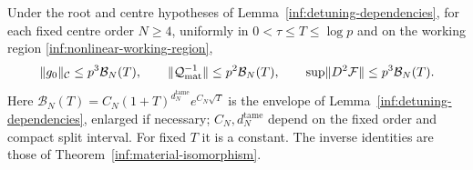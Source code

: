\begin{proposition}\label{inf:sharp-material}
Under the root and centre hypotheses of
Lemma~\ref{inf:detuning-dependencies}, for each fixed centre order
$N\ge4$, uniformly in
$0<\tau\le T\le\log p$ and on the working region
\eqref{inf:nonlinear-working-region},
\begin{equation}\label{inf:sharp-three-bounds}
 \lVert g_0\rVert_\mathcal C\le p^3\mathcal B_N(T),\qquad
 \lVert \mathcal Q_{\mathrm{mat}}^{-1}\rVert\le p^2\mathcal B_N(T),\qquad
 \sup\lVert D^2\mathcal F\rVert\le p^3\mathcal B_N(T).
\end{equation}
Here $\mathcal B_N(T)=C_N(1+T)^{d_N^{\mathrm{tame}}}e^{C_N\sqrt T}$
is the envelope of Lemma~\ref{inf:detuning-dependencies}, enlarged
if necessary; $C_N,d_N^{\mathrm{tame}}$ depend on the fixed order
and compact split interval. For fixed $T$ it is a constant.
The inverse identities are those of
Theorem~\ref{inf:material-isomorphism}.
\end{proposition}
